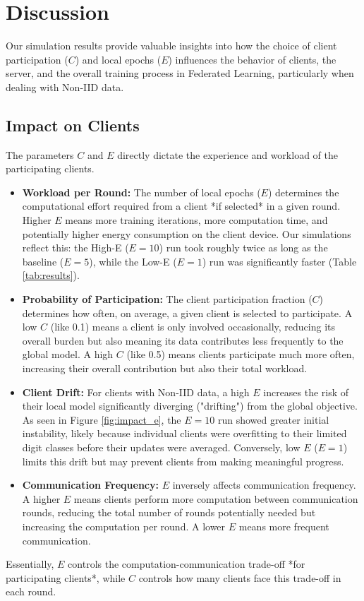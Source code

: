 \documentclass[conference]{IEEEtran}
\begin{document}
\section{Discussion}
Our simulation results provide valuable insights into how the choice of client participation ($C$) and local epochs ($E$) influences the behavior of clients, the server, and the overall training process in Federated Learning, particularly when dealing with Non-IID data.

\subsection{Impact on Clients}
The parameters $C$ and $E$ directly dictate the experience and workload of the participating clients.
\begin{itemize}
    \item \textbf{Workload per Round:} The number of local epochs ($E$) determines the computational effort required from a client *if selected* in a given round. Higher $E$ means more training iterations, more computation time, and potentially higher energy consumption on the client device. Our simulations reflect this: the High-E ($E=10$) run took roughly twice as long as the baseline ($E=5$), while the Low-E ($E=1$) run was significantly faster (Table \ref{tab:results}).
    \item \textbf{Probability of Participation:} The client participation fraction ($C$) determines how often, on average, a given client is selected to participate. A low $C$ (like 0.1) means a client is only involved occasionally, reducing its overall burden but also meaning its data contributes less frequently to the global model. A high $C$ (like 0.5) means clients participate much more often, increasing their overall contribution but also their total workload.
    \item \textbf{Client Drift:} For clients with Non-IID data, a high $E$ increases the risk of their local model significantly diverging ("drifting") from the global objective. As seen in Figure \ref{fig:impact_e}, the $E=10$ run showed greater initial instability, likely because individual clients were overfitting to their limited digit classes before their updates were averaged. Conversely, low $E$ ($E=1$) limits this drift but may prevent clients from making meaningful progress.
    \item \textbf{Communication Frequency:} $E$ inversely affects communication frequency. A higher $E$ means clients perform more computation between communication rounds, reducing the total number of rounds potentially needed but increasing the computation per round. A lower $E$ means more frequent communication.
\end{itemize}
Essentially, $E$ controls the computation-communication trade-off *for participating clients*, while $C$ controls how many clients face this trade-off in each round.
\end{document}
